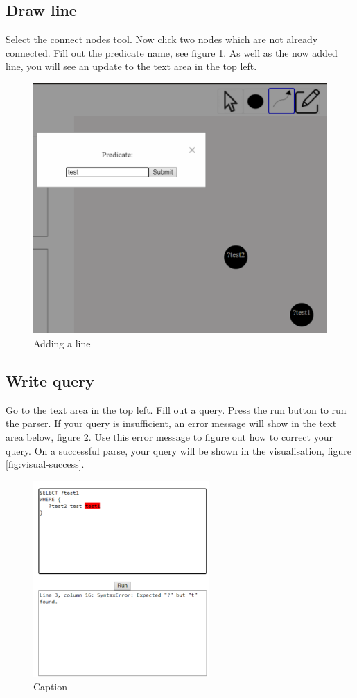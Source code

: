 \subsection{Draw line}
Select the connect nodes tool. Now click two nodes which are not already connected. Fill out the predicate name, see figure \ref{fig:user-line}. As well as the now added line, you will see an update to the text area in the top left.
\begin{figure}[H]
    \centering
    \includegraphics{figures/add-line-user.pdf}
    \caption{Adding a line}
    \label{fig:user-line}
\end{figure}
\subsection{Write query}
Go to the text area in the top left. Fill out a query. Press the run button to run the parser. If your query is insufficient, an error message will show in the text area below, figure \ref{fig:user-write-error}. Use this error message to figure out how to correct your query. On a successful parse, your query will be shown in the visualisation, figure \ref{fig:visual-success}.
\begin{figure}[H]
    \centering
    \includegraphics[width=0.6\textwidth]{figures/user-write-error.pdf}
    \caption{Caption}
    \label{fig:user-write-error}
\end{figure}

